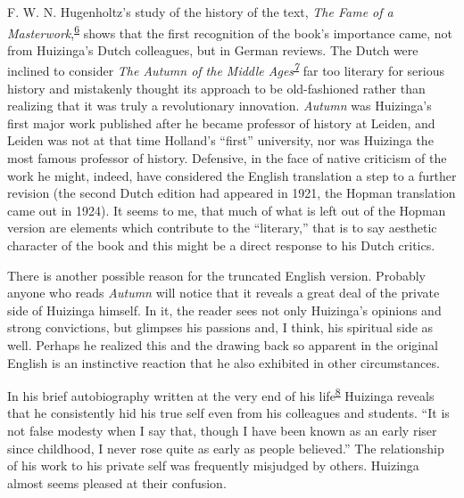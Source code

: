 F. W. N. Hugenholtz's study of the history of the text, \emph{The Fame
of a
Masterwork},\textsuperscript{\protect\hypertarget{05_TRANSLATOR_S_INTRODUCTION.xhtmlux5cux23id_2237}{\protect\hyperlink{23_NOTES.xhtmlux5cux23id_2238}{6}}}
shows that the first recognition of the book's importance came, not from
Huizinga's Dutch colleagues, but in German reviews. The Dutch were
inclined to consider \emph{The Autumn of the Middle
Ages\textsuperscript{\protect\hypertarget{05_TRANSLATOR_S_INTRODUCTION.xhtmlux5cux23id_2235}{\protect\hyperlink{23_NOTES.xhtmlux5cux23id_2236}{7}}}}
far too literary for serious history and mistakenly thought its approach
to be old-fashioned rather than realizing that it was truly a
revolutionary innovation. \emph{Autumn} was Huizinga's first major work
published after he became professor of history at
\protect\hypertarget{05_TRANSLATOR_S_INTRODUCTION.xhtmlux5cux23page_xii}{}{}Leiden,
and Leiden was not at that time Holland's ``first'' university, nor was
Huizinga the most famous professor of history. Defensive, in the face of
native criticism of the work he might, indeed, have considered the
English translation a step to a further revision (the second Dutch
edition had appeared in 1921, the Hopman translation came out in 1924).
It seems to me, that much of what is left out of the Hopman version are
elements which contribute to the ``literary,'' that is to say aesthetic
character of the book and this might be a direct response to his Dutch
critics.

There is another possible reason for the truncated English version.
Probably anyone who reads \emph{Autumn} will notice that it reveals a
great deal of the private side of Huizinga himself. In it, the reader
sees not only Huizinga's opinions and strong convictions, but glimpses
his passions and, I think, his spiritual side as well. Perhaps he
realized this and the drawing back so apparent in the original English
is an instinctive reaction that he also exhibited in other
circumstances.

In his brief autobiography written at the very end of his
life\textsuperscript{\protect\hypertarget{05_TRANSLATOR_S_INTRODUCTION.xhtmlux5cux23id_2233}{\protect\hyperlink{23_NOTES.xhtmlux5cux23id_2234}{8}}}
Huizinga reveals that he consistently hid his true self even from his
colleagues and students. ``It is not false modesty when I say that,
though I have been known as an early riser since childhood, I never rose
quite as early as people believed.'' The relationship of his work to his
private self was frequently misjudged by others. Huizinga almost seems
pleased at their confusion.

